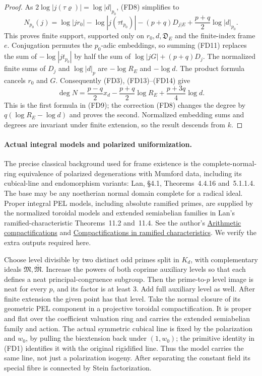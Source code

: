 \begin{proof}
As \(2\log|j(\tau\varrho)|=\log|d|_{p_0}\), (FD8) simplifies to
\[
 N_{p_0}(j)=\log|jr_0|-\log|j(\tau t_{p_0})|
                     -(p+q)D_{j|E}+\frac{p+q}{2}\log|d|_{p_0}.
 \tag{FD17}
\]
This proves finite support, supported only on \(r_0,d,\mathfrak D_E\)
and the finite-index frame \(e\).
Conjugation permutes the \(p_0\)-adic embeddings, so summing
(FD11) replaces the sum of \(-\log|jt_{p_0}|\) by half the sum
of \(\log|jG|+(p+q)D_j\).
The normalized finite sums of \(D_j\) and \(\log|d|_p\) are
\(-\log R_E\) and \(-\log d\).
The product formula cancels \(r_0\) and \(G\).  Consequently
(FD3), (FD13)--(FD14) give
\[
       \deg N=\frac{p-q}{2}x_d-\frac{p+q}{2}\log R_E
                                      +\frac{p+3q}{4}\log d .
\]
This is the first formula in (FD9); the correction (FD8)
changes the degree by \(q(\log R_E-\log d)\) and proves the second.
Normalized embedding sums and degrees are invariant under
finite extension, so the result descends from \(k\).
\end{proof}

\paragraph{Actual integral models and polarized uniformization.}
The precise classical background used for frame existence is
the complete-normal-ring equivalence of polarized
degenerations with Mumford data, including its cubical-line
and endomorphism variants: Lan, \S4.1, Theorems~4.4.16 and~5.1.1.4.
The base may be any noetherian normal domain complete for a
radical ideal.  Proper integral PEL models, including absolute
ramified primes, are supplied by the normalized toroidal models
and extended semiabelian families in Lan's ramified-characteristic
Theorems~11.2 and~11.4.
See the author's
\href{https://www.kwlan.org/articles/cpt-PEL-type-thesis-revision.pdf}
{Arithmetic compactifications} and
\href{https://www.kwlan.org/articles/cpt-ram-flat.pdf}
{Compactifications in ramified characteristics}.
We verify the extra outputs required here.

Choose level divisible by two distinct odd primes split in \(K_d\),
with complementary ideals \(\mathfrak M,\bar{\mathfrak M}\).
Increase the powers of both coprime auxiliary levels so that each defines a neat principal-congruence subgroup.  Then the prime-to-\(p\) level image is neat for every \(p\), and its factor is at least \(3\).  Add full auxiliary level as well.
After finite extension the given point has that level.
Take the normal closure of its geometric PEL component in a
projective toroidal compactification.
It is proper and flat over the coefficient valuation ring
and carries the extended semiabelian family and action.
The actual symmetric cubical line is fixed by the polarization
and \(w_0\), by pulling the biextension back under \((1,w_0)\);
the primitive identity in (FD1) identifies it with the original
rigidified line.  Thus the model carries the same line, not
just a polarization isogeny.
After separating the constant field its special fibre is
connected by Stein factorization.

